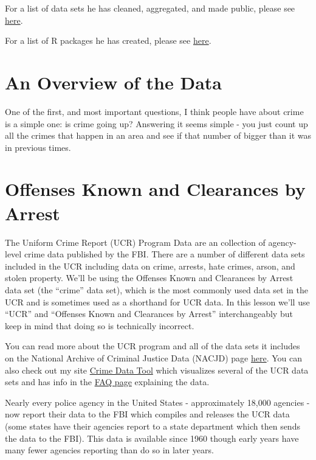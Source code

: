 \documentclass[
  12pt,
]{book}
\begin{document}
For a list of data sets he has cleaned, aggregated, and made public, please see \href{http://jacobdkaplan.com/data.html}{here}.

For a list of R packages he has created, please see \href{https://jacobdkaplan.com/packages.html}{here}.

\hypertarget{ucr_general}{%
\chapter{An Overview of the Data}\label{ucr_general}}

One of the first, and most important questions, I think people have about crime is a simple one: is crime going up? Answering it seems simple - you just count up all the crimes that happen in an area and see if that number of bigger than it was in previous times.

\hypertarget{offenses_known}{%
\chapter{Offenses Known and Clearances by Arrest}\label{offenses_known}}

The Uniform Crime Report (UCR) Program Data are an collection of agency-level crime data published by the FBI. There are a number of different data sets included in the UCR including data on crime, arrests, hate crimes, arson, and stolen property. We'll be using the Offenses Known and Clearances by Arrest data set (the ``crime'' data set), which is the most commonly used data set in the UCR and is sometimes used as a shorthand for UCR data. In this lesson we'll use ``UCR'' and ``Offenses Known and Clearances by Arrest'' interchangeably but keep in mind that doing so is technically incorrect.

You can read more about the UCR program and all of the data sets it includes on the National Archive of Criminal Justice Data (NACJD) page \href{https://www.icpsr.umich.edu/icpsrweb/content/NACJD/guides/ucr.html}{here}. You can also check out my site \href{http://crimedatatool.com}{Crime Data Tool} which visualizes several of the UCR data sets and has info in the \href{http://crimedatatool.com/faq.html}{FAQ page} explaining the data.

Nearly every police agency in the United States - approximately 18,000 agencies - now report their data to the FBI which compiles and releases the UCR data (some states have their agencies report to a state department which then sends the data to the FBI). This data is available since 1960 though early years have many fewer agencies reporting than do so in later years.
\end{document}
